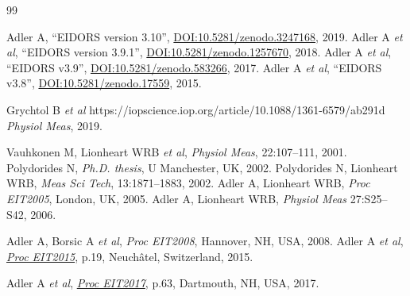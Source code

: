 \documentclass[10pt,letterpaper]{article}
\renewenvironment{thebibliography}[1]{%
    \begin{oldthebibliography}{#1}%
      \setlength{\parskip}{0ex}%
      \setlength{\itemsep}{0ex}%
  }%
  {%
    \end{oldthebibliography}%
  }
\begin{document}
\footnotesize
\begin{thebibliography}{99}
   Adler A, ``EIDORS version 3.10'',
   \href{http://dx.doi.org/10.5281/zenodo.3247168}{DOI:10.5281/zenodo.3247168},
    2019.
   Adler A {\em et al}, ``EIDORS version 3.9.1'',
   \href{http://dx.doi.org/10.5281/zenodo.1257670}{DOI:10.5281/zenodo.1257670},
    2018.
   Adler A {\em et al}, ``EIDORS v3.9'',
   \href{http://dx.doi.org/10.5281/zenodo.583266}{DOI:10.5281/zenodo.583266},
    2017.
   Adler A {\em et al}, ``EIDORS v3.8'',
   \href{http://dx.doi.org/10.5281/zenodo.17559}{DOI:10.5281/zenodo.17559},
    2015.

   Grychtol B {\em et al}
   https://iopscience.iop.org/article/10.1088/1361-6579/ab291d   
   {\em Physiol Meas}, 2019.



   Vauhkonen M, Lionheart WRB {\em  et al},
   {\em  Physiol Meas}, 22:107--111, 2001.
   Polydorides N,
 {\em Ph.D. thesis}, U Manchester, UK, 2002.
   Polydorides N, Lionheart WRB,
   {\em Meas Sci Tech}, 13:1871--1883, 2002.
Adler A, Lionheart WRB,
{\em Proc EIT2005}, London, UK, 2005.
%
Adler A, Lionheart WRB,
{\em Physiol Meas} 27:S25--S42, 2006.

Adler A, Borsic A {\em et al},
{\em Proc EIT2008}, Hannover, NH, USA, 2008.
Adler A {\em et al}, %
\href{https://zenodo.org/record/17752}{\em Proc EIT2015}, p.19, 
 Neuchâtel, Switzerland, 2015.

Adler A {\em et al}, %
\href{https://zenodo.org/record/557093}{\em Proc EIT2017}, p.63, 
Dartmouth, NH, USA,  2017.
\end{thebibliography}
\end{document}
